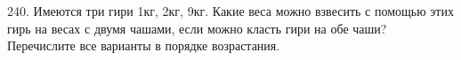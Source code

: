 240. Имеются три гири 1кг, 2кг, 9кг. Какие веса можно взвесить с помощью этих гирь на весах с двумя чашами, если можно класть гири на обе чаши? Перечислите все варианты в порядке возрастания.\\
